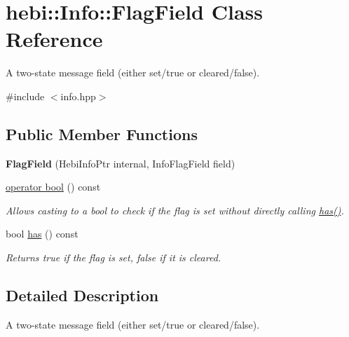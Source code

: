 \hypertarget{classhebi_1_1Info_1_1FlagField}{}\section{hebi\+:\+:Info\+:\+:Flag\+Field Class Reference}
\label{classhebi_1_1Info_1_1FlagField}


A two-\/state message field (either set/true or cleared/false).  




{\ttfamily \#include $<$info.\+hpp$>$}

\subsection*{Public Member Functions}
\begin{DoxyCompactItemize}
\item 
\mbox{\label{classhebi_1_1Info_1_1FlagField_a2c779f542b33a5ac7dbd020b6a56bccf}} 
{\bfseries Flag\+Field} (Hebi\+Info\+Ptr internal, Info\+Flag\+Field field)
\item 
\hyperlink{classhebi_1_1Info_1_1FlagField_a8bed163d96f1f05a9d1dec287d611a9c}{operator bool} () const
\begin{DoxyCompactList}\small\item\em Allows casting to a bool to check if the flag is set without directly calling {\ttfamily \hyperlink{classhebi_1_1Info_1_1FlagField_a3ffec34227542df3ec2ed5d9c0b9ee5a}{has()}}. \end{DoxyCompactList}\item 
\mbox{\label{classhebi_1_1Info_1_1FlagField_a3ffec34227542df3ec2ed5d9c0b9ee5a}} 
bool \hyperlink{classhebi_1_1Info_1_1FlagField_a3ffec34227542df3ec2ed5d9c0b9ee5a}{has} () const
\begin{DoxyCompactList}\small\item\em Returns {\ttfamily true} if the flag is set, false if it is cleared. \end{DoxyCompactList}\end{DoxyCompactItemize}


\subsection{Detailed Description}
A two-\/state message field (either set/true or cleared/false). 

